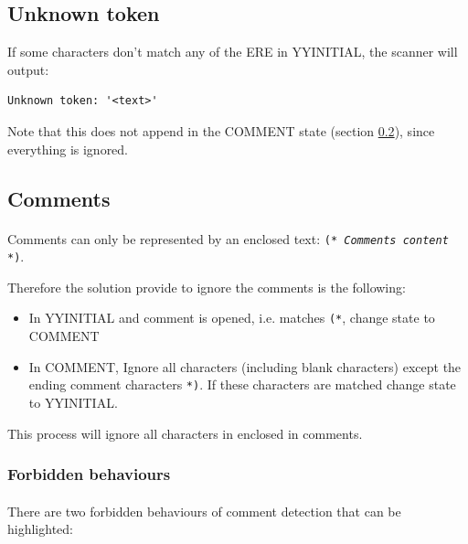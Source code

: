 \documentclass[letterpaper]{article}
\begin{document}
\subsection{Unknown token}

If some characters don't match any of the ERE in YYINITIAL, the scanner
will output:

\begin{lstlisting}[frame=single]
Unknown token: '<text>'
\end{lstlisting}

Note that this does not append in the COMMENT state (section \ref{comment}),
since everything is ignored.

\subsection{Comments}
\label{comment}

\paragraph{}

Comments can only be represented by an enclosed text:
 \texttt{(* \textit{Comments content} *)}.

Therefore the solution provide to ignore the comments is the following:
\begin{itemize}

\item In YYINITIAL and comment is opened, i.e. matches \texttt{(*},
change state to COMMENT

\item In COMMENT, Ignore all characters
(including blank characters) except the ending comment
characters \texttt{*)}.
If these characters are matched change state to YYINITIAL.

\end{itemize}

This process will ignore all characters in enclosed in comments.

\subsubsection{Forbidden behaviours}
\label{comment_forbidden}
\paragraph{}
There are two forbidden behaviours of comment detection that can be highlighted:
\end{document}
